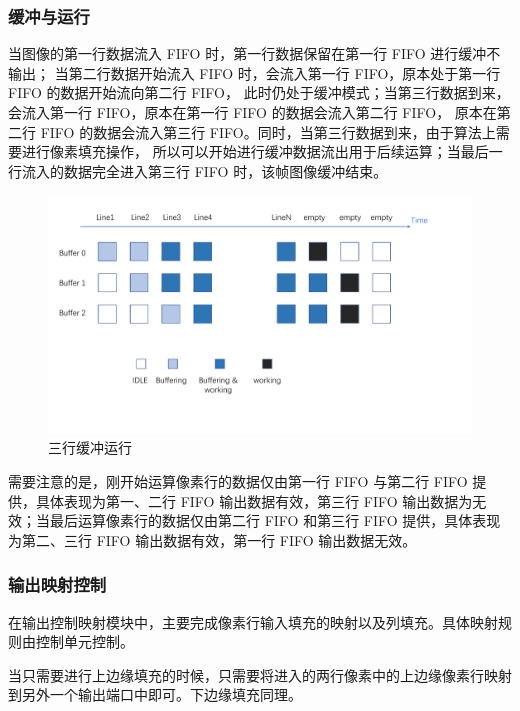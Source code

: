 \documentclass[12pt, a4paper, oneside]{ctexbook}
\begin{document}
	\subsubsection{缓冲与运行}
	当图像的第一行数据流入 FIFO 时，第一行数据保留在第一行 FIFO 进行缓冲不输出；
	当第二行数据开始流入 FIFO 时，会流入第一行 FIFO，原本处于第一行 FIFO 的数据开始流向第二行 FIFO，
	此时仍处于缓冲模式；当第三行数据到来，会流入第一行 FIFO，原本在第一行 FIFO 的数据会流入第二行 FIFO，
	原本在第二行 FIFO 的数据会流入第三行 FIFO。同时，当第三行数据到来，由于算法上需要进行像素填充操作，
	所以可以开始进行缓冲数据流出用于后续运算；当最后一行流入的数据完全进入第三行 FIFO 时，该帧图像缓冲结束。
		\begin{figure}[h]
			\centering
			\includegraphics[scale=0.4]{pic/fifo_3_2.pdf}
			\caption{三行缓冲运行}
		\end{figure}
	\par 需要注意的是，刚开始运算像素行的数据仅由第一行 FIFO 与第二行 FIFO 提供，具体表现为第一、二行 FIFO 输出数据有效，第三行 FIFO 输出数据为无效；当最后运算像素行的数据仅由第二行 FIFO 和第三行 FIFO 提供，具体表现为第二、三行 FIFO 输出数据有效，第一行 FIFO 输出数据无效。
	\subsubsection{输出映射控制}
	在输出控制映射模块中，主要完成像素行输入填充的映射以及列填充。具体映射规则由控制单元控制。\par 当只需要进行上边缘填充的时候，只需要将进入的两行像素中的上边缘像素行映射到另外一个输出端口中即可。下边缘填充同理。 \\
	
\end{document}
